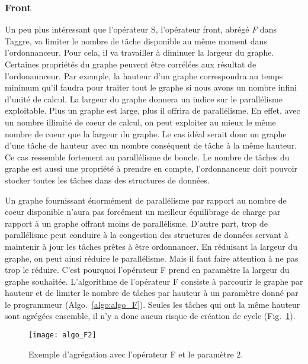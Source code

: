 \subsubsection{Front}
Un peu plus intéressant que l'opérateur S, l'opérateur front, abrégé {\em F} dans Taggre, va limiter le nombre de tâche disponible au même moment dans l'ordonnanceur.
%
Pour cela, il va travailler à diminuer la largeur du graphe.
%
Certaines propriétés du graphe peuvent être corrélées aux résultat de l'ordonannceur.
%
Par exemple, la hauteur d'un graphe correspondra au temps minimum qu'il faudra pour traiter tout le graphe si nous avons un nombre infini d'unité de calcul.
%
La largeur du graphe donnera un indice sur le parallélisme exploitable.
%
Plus un graphe est large, plus il offrira de parallélisme.
%
En effet, avec un nombre illimité de coeur de calcul, on peut exploiter au mieux le même nombre de coeur que la largeur du graphe.
%
Le cas idéal serait donc un graphe d'une tâche de hauteur avec un nombre conséquent de tâche à la même hauteur.
%
Ce cas ressemble fortement au parallélisme de boucle.
%
Le nombre de tâches du graphe est aussi une propriété à prendre en compte, l'ordonnanceur doit pouvoir stocker toutes les tâches dans des structures de données.



Un graphe fournissant énormément de parallélisme par rapport au nombre de coeur disponible n'aura pas forcément un meilleur équilibrage de charge par rapport à un graphe offrant moins de parallélisme.
%
D'autre part, trop de parallélisme peut conduire à la congestion des structures de données servant à maintenir à jour les tâches prêtes à être ordonnancer.
%
En réduisant la largeur du graphe, on peut ainsi réduire le parallélisme.
%
Mais il faut faire attention à ne pas trop le réduire.
%
C'est pourquoi l'opérateur F prend en paramètre la largeur du graphe souhaitée.
%
L'algorithme de l'opérateur F consiste à parcourir le graphe par hauteur et de limiter le nombre de tâches par hauteur à un paramètre donné par le programmeur (Algo.~\ref{algo:algo_F}).
%
Seules les tâches qui ont la même hauteur sont agrégées ensemble, il n'y a donc aucun risque de création de cycle (Fig.~\ref{fig:algo_F2}).


\begin{figure}[t!]
  \centering
  \texttt{[image: algo\_F2]}
  \caption{Exemple d'agrégation avec l'opérateur F et le paramètre 2.}
  \label{fig:algo_F2}
\end{figure}

